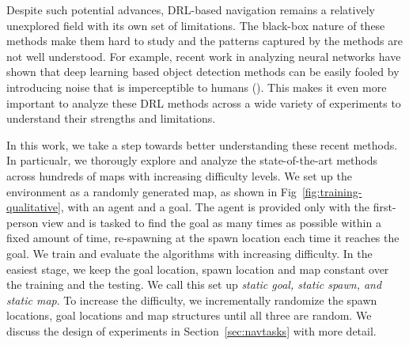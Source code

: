 Despite such potential advances, DRL-based navigation remains a relatively unexplored field with its own set of limitations. 
The black-box nature of these methods make them hard to study and the patterns captured by the methods are not well understood. 
For example, recent work in analyzing neural networks have shown that deep learning based object detection methods can be easily fooled by introducing noise that is imperceptible to humans (\cite{NgYoClCVPR2015}). 
This makes it even more important to analyze these DRL methods across a wide variety of experiments to understand their strengths and limitations.


In this work, we take a step towards better understanding these recent methods. In particualr, we thorougly explore and analyze the state-of-the-art \cite{MiPaViICLR2017} methods across hundreds of maps with increasing difficulty levels. 
We set up the environment as a randomly generated map, as shown in Fig~\ref{fig:training-qualitative}, with an agent and a goal.
The agent is provided only with the first-person view and is tasked to find the goal as many times as possible within a fixed amount of time, re-spawning at the spawn location each time it reaches the goal.
We train and evaluate the algorithms with increasing difficulty.
In the easiest stage, we keep the goal location, spawn location and map constant over the training and the testing.
We call this set up \emph{static goal, static spawn, and static map}.
To increase the difficulty, we incrementally randomize the spawn locations, goal locations and map structures until all three are random.
We discuss the design of experiments in Section~\ref{sec:navtasks} with more detail.

